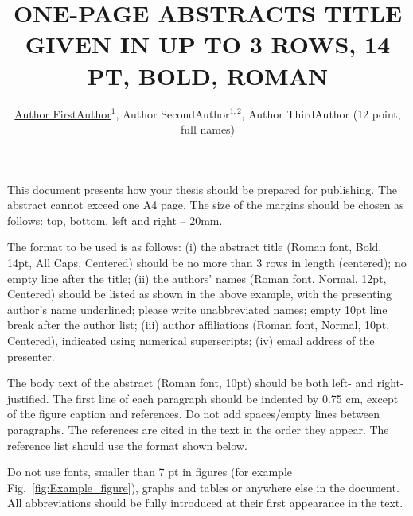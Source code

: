 ﻿\documentclass[a4paper,10pt,english]{article}
\begin{document}
\renewcommand{\figurename}{Fig.} 


\title{ONE-PAGE ABSTRACTS TITLE GIVEN IN UP TO 3 ROWS, 14 PT, BOLD, ROMAN }


\author{\uline{Author FirstAuthor}$^{1}$, Author SecondAuthor$^{1,2}$, Author ThirdAuthor
(12 point, full names)}

\maketitle

\address{$^{1}$Department of Physics, University of North Pole, Some Country
(10 point) }


\address{$^{2}$Department of Chemistry, University of South Pole, Other Country }



This document presents how your thesis should be prepared for publishing. The abstract cannot exceed one A4 page. The size of the margins should be chosen as follows: top, bottom, left and right -- 20mm.

The format to be used is as follows: (i) the abstract title (Roman font, Bold, 14pt, All Caps, Centered) should be no more than 3 rows in length (centered); no empty line after the title; (ii) the authors’ names (Roman font, Normal, 12pt, Centered) should be listed as shown in the above example, with the presenting author’s name underlined; please write unabbreviated names; empty 10pt line break after the author list; (iii) author affiliations (Roman font, Normal, 10pt, Centered), indicated using numerical superscripts; (iv) email address of the presenter.

The body text of the abstract (Roman font, 10pt) should be both left- and right-justified. The first line of each paragraph should be indented by 0.75 cm, except of the figure caption and references. Do not add spaces/empty lines between paragraphs. The references \cite{key-1} are cited in the text in the order they appear. The reference list should use the format shown below.

Do not use fonts, smaller than 7 pt in figures (for example Fig.~\ref{fig:Example_figure}), graphs and tables or anywhere else in the document. All abbreviations should be fully introduced at their first appearance in the text.
\end{document}
